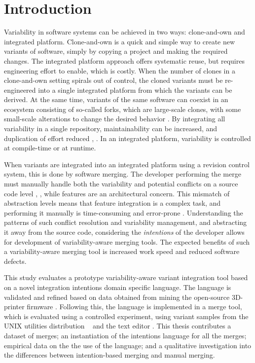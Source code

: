 \chapter{Introduction}
Variability in software systems can be achieved in two ways: clone-and-own and integrated platform. Clone-and-own is a quick and simple way to create new variants of software, simply by copying a project and making the required changes. The integrated platform approach offers systematic reuse, but requires engineering effort to enable, which is costly. When the number of clones in a clone-and-own setting spirals out of control, the cloned variants must be re-engineered into a single integrated platform from which the variants can be derived. At the same time, variants of the same software can coexist in an ecosystem consisting of so-called forks, which are large-scale clones, with some small-scale alterations to change the desired behavior \cite{stanciulescu2015}. By integrating all variability in a single repository, maintainability can be increased, and duplication of effort reduced \cite{schmorleiz2016similarity}, \cite{stanciulescu2015}. In an integrated platform, variability is controlled at compile-time or at runtime.

When variants are integrated into an integrated platform using a revision control system, this is done by software merging. The developer performing the merge must manually handle both the variability and potential conflicts on a source code level \cite{mens2002}, \cite{apel2011}, while features are an architectural concern. This mismatch of abstraction levels means that feature integration is a complex task, and performing it manually is time-consuming and error-prone \cite{melo2016latin}. Understanding the patterns of such conflict resolution and variability management, and abstracting it away from the source code, considering the \textit{intentions} of the developer allows for development of variability-aware merging tools. The expected benefits of such a variability-aware merging tool is increased work speed and reduced software defects.

This study evaluates a prototype variability-aware variant integration tool based on a novel integration intentions domain specific language.
The language is validated and refined based on data obtained from mining the open-source 3D-printer firmware \marlin. Following this, the language is implemented in a merge tool, which is evaluated using a controlled experiment, using variant samples from the UNIX utilities distribution \busybox~ and the text editor \vim. This thesis contributes a dataset of merges; an instantiation of the intentions language for all the merges; empirical data on the the use of the language; and a qualitative investigation into the differences between intention-based merging and manual merging.

